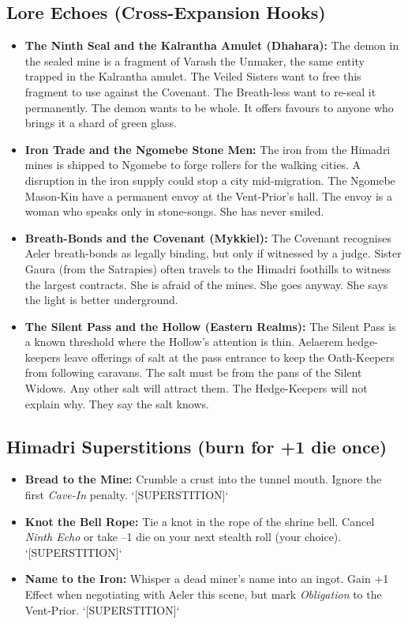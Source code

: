 \subsection*{Lore Echoes (Cross-Expansion Hooks)}
\begin{itemize}
  \item \textbf{The Ninth Seal and the Kalrantha Amulet (Dhahara):} The demon in the sealed mine is a fragment of Varash the Unmaker, the same entity trapped in the Kalrantha amulet. The Veiled Sisters want to free this fragment to use against the Covenant. The Breath-less want to re-seal it permanently. The demon wants to be whole. It offers favours to anyone who brings it a shard of green glass.
  \item \textbf{Iron Trade and the Ngomebe Stone Men:} The iron from the Himadri mines is shipped to Ngomebe to forge rollers for the walking cities. A disruption in the iron supply could stop a city mid-migration. The Ngomebe Mason-Kin have a permanent envoy at the Vent-Prior's hall. The envoy is a woman who speaks only in stone-songs. She has never smiled.
  \item \textbf{Breath-Bonds and the Covenant (Mykkiel):} The Covenant recognises Aeler breath-bonds as legally binding, but only if witnessed by a judge. Sister Gaura (from the Satrapies) often travels to the Himadri foothills to witness the largest contracts. She is afraid of the mines. She goes anyway. She says the light is better underground.
  \item \textbf{The Silent Pass and the Hollow (Eastern Realms):} The Silent Pass is a known threshold where the Hollow's attention is thin. Aelaerem hedge-keepers leave offerings of salt at the pass entrance to keep the Oath-Keepers from following caravans. The salt must be from the pans of the Silent Widows. Any other salt will attract them. The Hedge-Keepers will not explain why. They say the salt knows.
\end{itemize}

\subsection*{Himadri Superstitions (burn for +1 die once)}
\begin{itemize}
  \item \textbf{Bread to the Mine:} Crumble a crust into the tunnel mouth. Ignore the first \emph{Cave-In} penalty. `[SUPERSTITION]`
  \item \textbf{Knot the Bell Rope:} Tie a knot in the rope of the shrine bell. Cancel \emph{Ninth Echo} or take –1 die on your next stealth roll (your choice). `[SUPERSTITION]`
  \item \textbf{Name to the Iron:} Whisper a dead miner's name into an ingot. Gain +1 Effect when negotiating with Aeler this scene, but mark \emph{Obligation} to the Vent-Prior. `[SUPERSTITION]`
\end{itemize}

